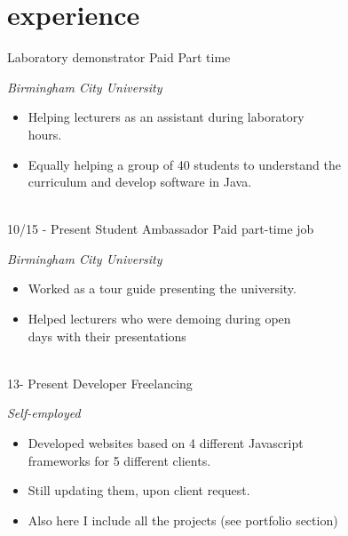 \documentclass[]{friggeri-cv}
\begin{document}
\section{experience}
\begin{entrylist}

    {Laboratory demonstrator}
    {Paid Part time}
    {
    \emph{Birmingham City University}
    \begin{itemize}
    \item Helping lecturers as an assistant during laboratory \\hours.
    \item Equally helping a group of 40 students to understand the \\ curriculum and develop software in Java.
    \end{itemize}
    }


   
  
 
  \\
  \entry
  {10/15 - Present}
  {Student Ambassador}
  {Paid part-time job}
  {\emph{Birmingham City University} 
    \begin{itemize}
      \item Worked as a tour guide presenting the university.
      \item Helped lecturers who were demoing during open \\days with their presentations
    \end{itemize}}\\
    
    \entry
  {13- Present}
  {Developer}
  {Freelancing}
  {\emph {Self-employed} 
    \begin{itemize}
      \item Developed websites based on 4 different Javascript \\ frameworks
      for 5 different clients.
      \item Still updating them, upon client request.
      \item Also here I include all the projects (see portfolio section)
    \end{itemize}}\\
  
\end{entrylist}
\end{document}
